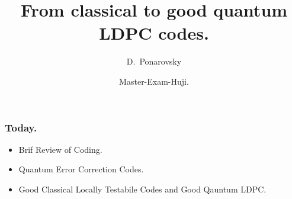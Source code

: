 \documentclass[usenames, aspectratio=169]{beamer}
\title[From classical to good quantum LDPC codes.] %
{From classical to good quantum LDPC codes.}
\subtitle{  }
\author[D.~Ponarovsky] %
	{D.~Ponarovsky\inst{1}}
\institute[HUJI] %
{  Faculty of Computer Science\newline
  Hebrew University of Jerusalem
}
\date[2023] %
{Master-Exam-Huji.}
\theoremstyle{claim}
\theoremstyle{remark}
\newcommand{\pslsq}[4]{
\begin{frame}
    \frametitle{#1} 
    \texttt{[image: \#3]}
    #4  
  \end{frame}
}
\begin{document}



\begin{frame}
  \maketitle
\end{frame}

\begin{frame}
  \frametitle{ Today. }
  \begin{itemize}
    \item<1-> Brif Review of Coding. 
    \item<3-> Quantum Error Correction Codes. 
    \item<4->Good Classical Locally Testabile Codes and Good Qauntum LDPC.
  \end{itemize} 
\end{frame}
\end{document}
